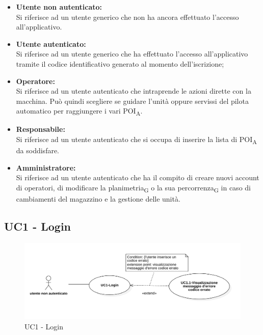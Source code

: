 \begin{itemize}
	\item{\textbf{Utente non autenticato:}\\
	Si riferisce ad un utente generico che non ha ancora effettuato l'accesso all'applicativo.}
	\item{\textbf{Utente autenticato:}\\
	Si riferisce ad un utente generico che ha effettuato l'accesso all'applicativo tramite il codice identificativo generato al momento dell'iscrizione;}
	\item{\textbf{Operatore:}\\
	Si riferisce ad un utente autenticato che intraprende le azioni dirette con la macchina. Può quindi scegliere se guidare l'unità oppure servissi del pilota automatico per raggiungere i vari \acrshort{POI}\textsubscript{A}.}
	\item{\textbf{Responsabile:}\\
	Si riferisce ad un utente autenticato che si occupa di inserire la lista di \acrshort{POI}\textsubscript{A} da soddisfare.}
	\item{\textbf{Amministratore:}\\
	Si riferisce ad un utente autenticato che ha il compito di creare nuovi account di operatori, di modificare la \gls{planimetria}\textsubscript{G} o la sua \gls{percorrenza}\textsubscript{G} in caso di cambiamenti del magazzino e la gestione delle unità.}
\end{itemize}

\subsection{UC1 - Login}
\begin{figure}[H]
	\centering
	\includegraphics[scale=0.52]{res/images/uc1.png}
	\caption{UC1 - Login}
\end{figure}


